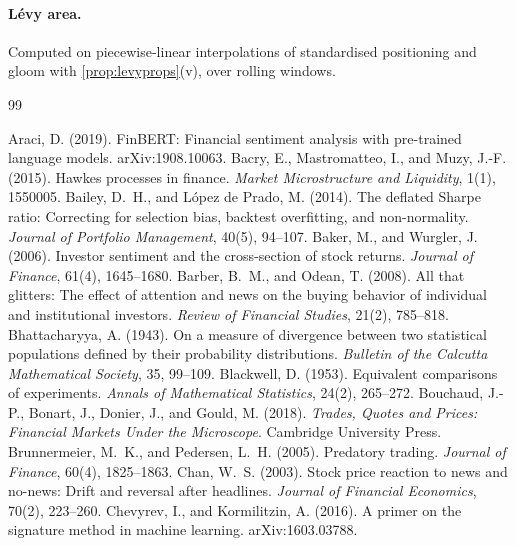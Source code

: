 \documentclass[11pt,a4paper]{article}
\theoremstyle{plain}
\theoremstyle{definition}
\theoremstyle{remark}
\begin{document}
\paragraph{L\'evy area.} Computed on piecewise-linear interpolations of standardised positioning and gloom with \cref{prop:levyprops}(v), over rolling windows.

\clearpage
\begin{thebibliography}{99}\small

 Araci, D. (2019). FinBERT: Financial sentiment analysis with pre-trained language models. arXiv:1908.10063.
 Bacry, E., Mastromatteo, I., and Muzy, J.-F. (2015). Hawkes processes in finance. \emph{Market Microstructure and Liquidity}, 1(1), 1550005.
 Bailey, D.~H., and L\'opez de Prado, M. (2014). The deflated Sharpe ratio: Correcting for selection bias, backtest overfitting, and non-normality. \emph{Journal of Portfolio Management}, 40(5), 94--107.
 Baker, M., and Wurgler, J. (2006). Investor sentiment and the cross-section of stock returns. \emph{Journal of Finance}, 61(4), 1645--1680.
 Barber, B.~M., and Odean, T. (2008). All that glitters: The effect of attention and news on the buying behavior of individual and institutional investors. \emph{Review of Financial Studies}, 21(2), 785--818.
 Bhattacharyya, A. (1943). On a measure of divergence between two statistical populations defined by their probability distributions. \emph{Bulletin of the Calcutta Mathematical Society}, 35, 99--109.
 Blackwell, D. (1953). Equivalent comparisons of experiments. \emph{Annals of Mathematical Statistics}, 24(2), 265--272.
 Bouchaud, J.-P., Bonart, J., Donier, J., and Gould, M. (2018). \emph{Trades, Quotes and Prices: Financial Markets Under the Microscope}. Cambridge University Press.
 Brunnermeier, M.~K., and Pedersen, L.~H. (2005). Predatory trading. \emph{Journal of Finance}, 60(4), 1825--1863.
 Chan, W.~S. (2003). Stock price reaction to news and no-news: Drift and reversal after headlines. \emph{Journal of Financial Economics}, 70(2), 223--260.
 Chevyrev, I., and Kormilitzin, A. (2016). A primer on the signature method in machine learning. arXiv:1603.03788.

\end{thebibliography}
\end{document}
